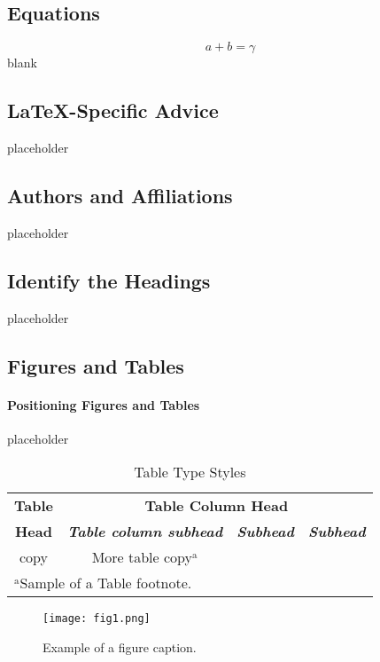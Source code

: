 \documentclass[conference]{IEEEtran}
\begin{document}
\subsection{Equations}
\begin{equation}
a+b=\gamma\label{eq}
\end{equation}
blank

\subsection{\LaTeX-Specific Advice}

placeholder


\subsection{Authors and Affiliations}
placeholder

\subsection{Identify the Headings}
placeholder

\subsection{Figures and Tables}
\paragraph{Positioning Figures and Tables} placeholder

\begin{table}[htbp]
\caption{Table Type Styles}
\begin{center}
\begin{tabular}{|c|c|c|c|}
\hline
\textbf{Table}&\multicolumn{3}{|c|}{\textbf{Table Column Head}} \\
\cline{2-4} 
\textbf{Head} & \textbf{\textit{Table column subhead}}& \textbf{\textit{Subhead}}& \textbf{\textit{Subhead}} \\
\hline
copy& More table copy$^{\mathrm{a}}$& &  \\
\hline
\multicolumn{4}{l}{$^{\mathrm{a}}$Sample of a Table footnote.}
\end{tabular}
\label{tab1}
\end{center}
\end{table}

\begin{figure}[htbp]
\centerline{\texttt{[image: fig1.png]}}
\caption{Example of a figure caption.}
\label{fig}
\end{figure}
\end{document}
